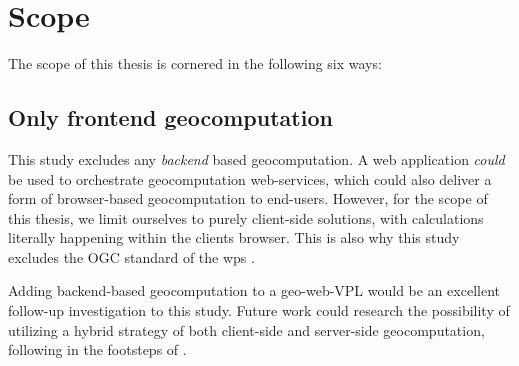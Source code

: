 







\newpage
\section{Scope}
The scope of this thesis is cornered in the following six ways: 

\subsection*{Only frontend geocomputation}
This study excludes any \emph {backend} based geocomputation.
A web application \textit{could} be used to orchestrate geocomputation web-services, which could also deliver a form of browser-based geocomputation to end-users. 
However, for the scope of this thesis, we limit ourselves to purely client-side solutions, with calculations literally happening within the clients browser. 
This is also why this study excludes the OGC standard of the \ac{wps} \cite{ogc_web_2015}.

Adding backend-based geocomputation to a geo-web-VPL would be an excellent follow-up investigation to this study. 
Future work could research the possibility of utilizing a hybrid strategy of both client-side and server-side geocomputation, following in the footsteps of \cite{panidi_hybrid_2015}. 

